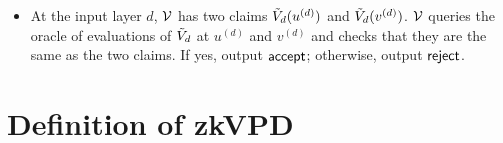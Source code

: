 {{{{\begin{protocol}
\begin{itemize}
\begin{itemize}
								\item At the end of the sumcheck protocol, $\P$ sends $\V$ $\tV_{i+1}(u^{(i+1)})$ and $\tV_{i+1}(v^{(i+1)})$.
								
								
								\item $\V$ computes the following and checks if it equals to the last message of the sumcheck. For simplicity, let $Mult_{i+1}(x) = \tilde{mult}_{i+1}(x, u^{(i+1)}, v^{(i+1)})$ and $Add_{i+1}(x) = \tilde{add}_{i+1}(x, u^{(i+1)}, v^{(i+1)})$.
								\begin{align*}
								&(\alpha^{(i)}Mult_{i+1}(u^{(i)})+\beta^{(i)}Mult_{i+1}(v^{(i)})(\tV_{i+1}(u^{(i+1)})\tV_{i+1}(v^{(i+1)}))+\\
						        &(\alpha^{(i)}\tilde{Add}_{i+1}(u^{(i)})+\beta^{(i)}\tilde{Add}_{i+1}(v^{(i)})(\tV_{i+1}(u^{(i+1)})+\tV_{i+1}(v^{(i+1)}))
								\end{align*}
								If all checks in the sumcheck pass, $V$ uses $\tV_{i+1}(u^{(i+1)})$ and $\tV_{i+1}(v^{(i+1)})$ to proceed to the $(i+1)$-th layer. Otherwise, $\V$ outputs $\reject$ and aborts.
								
							\end{itemize}
							\item At the input layer $d$, $\V$ has two claims $\tilde{V}_{d}(u^{(d)})$ and $\tilde{V}_{d}(v^{(d)})$. $\V$ queries the oracle of evaluations of $\tilde{V}_d$ at $u^{(d)}$ and $v^{(d)}$ and checks that they are the same as the two claims. If yes, output $\mathsf{accept}$; otherwise, output $\reject$.
							
						\end{itemize}
	\end{protocol}}}}}

\section{Definition of zkVPD}\label{app:zkvpd}

